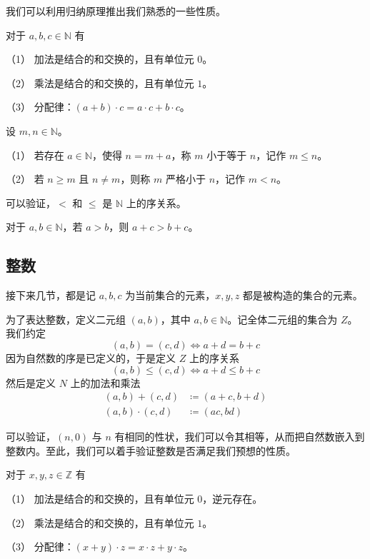 我们可以利用归纳原理推出我们熟悉的一些性质。

\begin{theorem}
	对于 $a,b,c\in \mathbb{N}$ 有

	（1） 加法是结合的和交换的，且有单位元 $0$。

	（2） 乘法是结合的和交换的，且有单位元 $1$。

	（3） 分配律：$(a+b) \cdot  c = a \cdot c + b\cdot c$。
\end{theorem}

\begin{definition}[$\mathbb{N}$ 的序]
	设 $m,n\in \mathbb{N}$。

	（1） 若存在 $a\in \mathbb{N}$，使得 $n=m+a$，称 $m$ 小于等于 $n$，记作 $m \leqslant n$。

	（2） 若 $n\geqslant m$ 且 $n\ne m$，则称 $m$ 严格小于 $n$，记作 $m < n$。
\end{definition}

可以验证，$<$ 和 $\leqslant$ 是 $\mathbb{N}$ 上的序关系。

\begin{theorem}[加法保序]
	对于 $a,b\in \mathbb{N}$，若 $a>b$，则 $a+c>b+c$。
\end{theorem}

\subsection{整数}

接下来几节，都是记 $a,b,c$ 为当前集合的元素，$x,y,z$ 都是被构造的集合的元素。

为了表达整数，定义二元组 $(a,b)$，其中 $a,b \in \mathbb{N}$。记全体二元组的集合为 $Z$。我们约定
\[ (a,b) = (c,d) \Leftrightarrow a+d=b+c\]
因为自然数的序是已定义的，于是定义 $Z$ 上的序关系
\[ (a,b) \leqslant (c,d) \Leftrightarrow a+d \leqslant b+c\]
然后是定义 $N$ 上的加法和乘法
\[
	\begin{aligned}
		(a,b) + (c,d)     & \coloneqq  (a+c,b+d) \\
		(a,b) \cdot (c,d) & \coloneqq  (a c,b d)
	\end{aligned}
\]

可以验证，$(n,0)$ 与 $n$ 有相同的性状，我们可以令其相等，从而把自然数嵌入到整数内。至此，我们可以着手验证整数是否满足我们预想的性质。

\begin{theorem}
	对于 $x,y,z\in \mathbb{Z}$ 有

	（1） 加法是结合的和交换的，且有单位元 $0$，逆元存在。

	（2） 乘法是结合的和交换的，且有单位元 $1$。

	（3） 分配律：$(x+y) \cdot  z = x \cdot z + y\cdot z$。
\end{theorem}

